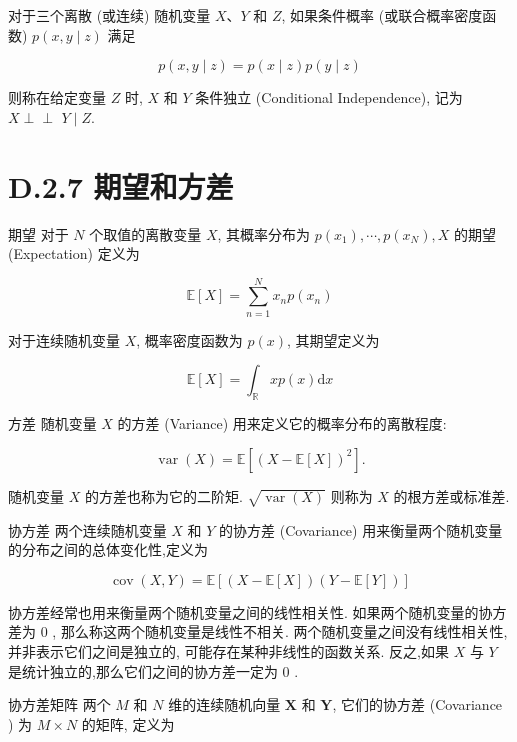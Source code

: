 \documentclass[10pt]{article}
\def\Perp{\perp\!\!\!\perp}
\begin{document}
对于三个离散 (或连续) 随机变量 $X 、 Y$ 和 $Z$, 如果条件概率 (或联合概率密度函数) $p(x, y \mid z)$ 满足


\begin{equation*}
p(x, y \mid z)=p(x \mid z) p(y \mid z) \tag{D.34}
\end{equation*}


则称在给定变量 $Z$ 时, $X$ 和 $Y$ 条件独立 (Conditional Independence), 记为 $X \Perp$ $Y \mid Z$.

\section*{D.2.7 期望和方差}
期望 对于 $N$ 个取值的离散变量 $X$, 其概率分布为 $p\left(x_{1}\right), \cdots, p\left(x_{N}\right), X$ 的期望 (Expectation) 定义为


\begin{equation*}
\mathbb{E}[X]=\sum_{n=1}^{N} x_{n} p\left(x_{n}\right) \tag{D.35}
\end{equation*}


对于连续随机变量 $X$, 概率密度函数为 $p(x)$, 其期望定义为


\begin{equation*}
\mathbb{E}[X]=\int_{\mathbb{R}} x p(x) \mathrm{d} x \tag{D.36}
\end{equation*}


方差 随机变量 $X$ 的方差 (Variance) 用来定义它的概率分布的离散程度:


\begin{equation*}
\operatorname{var}(X)=\mathbb{E}\left[(X-\mathbb{E}[X])^{2}\right] . \tag{D.37}
\end{equation*}


随机变量 $X$ 的方差也称为它的二阶矩. $\sqrt{\operatorname{var}(X)}$ 则称为 $X$ 的根方差或标准差.

协方差 两个连续随机变量 $X$ 和 $Y$ 的协方差 (Covariance) 用来衡量两个随机变量的分布之间的总体变化性,定义为


\begin{equation*}
\operatorname{cov}(X, Y)=\mathbb{E}[(X-\mathbb{E}[X])(Y-\mathbb{E}[Y])] \tag{D.38}
\end{equation*}


协方差经常也用来衡量两个随机变量之间的线性相关性. 如果两个随机变量的协方差为 0 , 那么称这两个随机变量是线性不相关. 两个随机变量之间没有线性相关性, 并非表示它们之间是独立的, 可能存在某种非线性的函数关系. 反之,如果 $X$ 与 $Y$ 是统计独立的,那么它们之间的协方差一定为 0 .

协方差矩阵 两个 $M$ 和 $N$ 维的连续随机向量 $\boldsymbol{X}$ 和 $\boldsymbol{Y}$, 它们的协方差 (Covariance ) 为 $M \times N$ 的矩阵, 定义为
\end{document}
